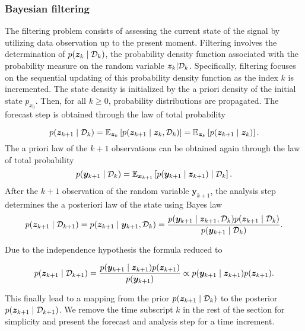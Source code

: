 \subsubsection{Bayesian filtering}

The filtering problem consists of assessing the current state of the signal by utilizing data observation up to the present moment. Filtering involves the determination of $p(\bm{z}_{k} \mid \mathcal{D}_{k})$, the probability density function associated with the probability measure on the random variable $\bm{z}_{k} | \mathcal D_{k}$. Specifically, filtering focuses on the sequential updating of this probability density function as the index $k$ is incremented.
The state density is initialized by the a priori density of the initial state $p_{x_0}$.
Then, for all $k \geq 0$, probability distributions are propagated.
The forecast step is obtained through the law of total probability

\begin{equation*}
    p(\bm{z}_{k+1} \mid \mathcal D_k) = \mathbb{E}_{\bm{z}_k}\left[p(\bm{z}_{k+1} \mid  \bm{z}_k,\mathcal{D}_k)\right] = \mathbb{E}_{\bm{z}_k}\left[p(\bm{z}_{k+1} \mid \bm{z}_k)\right].
\end{equation*}
The a priori law of the $k+1$ observations can be obtained again through the law of total probability
\begin{equation*}
    p(\bm y_{k+1} \mid \mathcal D_k) = \mathbb{E}_{\bm{x}_{k+1}}\left[p(\bm y_{k+1}\mid \bm{z}_{k+1}) \mid \mathcal D_k\right].
\end{equation*}
After the $k+1$ observation of the random variable $\bm y_{k+1}$, the analysis step determines the a posteriori law of the state using Bayes law
\begin{equation*}
    p(\bm{z}_{k+1} \mid \mathcal D_{k+1}) = p(\bm{z}_{k+1} \mid \bm y_{k+1}, \mathcal D_{k})  = \frac{p(\bm y_{k+1} \mid \bm{z}_{k+1} ,\mathcal D_k)  p(\bm{z}_{k+1}\mid \mathcal D_k)}{p(\bm y_{k+1}\mid \mathcal D_k)}.
\end{equation*}

Due to the independence hypothesis the formula reduced to

\begin{equation*}
    p(\bm{z}_{k+1} \mid \mathcal D_{k+1}) = \frac{p(\bm y_{k+1} \mid \bm{z}_{k+1})  p(\bm{z}_{k+1})}{p(\bm y_{k+1})} \propto p(\bm y_{k+1} \mid \bm{z}_{k+1})  p(\bm{z}_{k+1}).
\end{equation*}

This finally lead to a mapping from the prior $p(\bm{z}_{k+1} \mid \mathcal D_k)$ to the posterior $p(\bm{z}_{k+1} \mid \mathcal D_{k+1})$.
We remove the time subscript $k$ in the rest of the section for simplicity and present the forecast and analysis step for a time increment.


